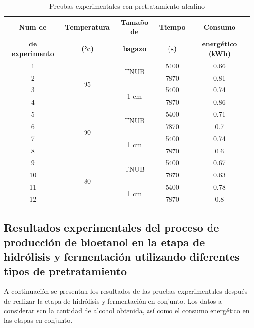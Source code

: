 \documentclass[12pt]{article}
\begin{document}
		
		\begin{table}[H]
			\centering
			\caption{Preubas experimentales con pretratamiento alcalino}
			\begin{tabular}{|c|c|c|c|c|}
				\hline
				\textbf{Num de} & \textbf{Temperatura} & \textbf{Tamaño de } & \textbf{Tiempo} & \textbf{Consumo } \\ 
			\textbf{de experimento}	&\textbf{ (°c)}&\textbf{ bagazo}  &\textbf{(s)}	&\textbf{ energético (kWh)}\\ \hline
				1 & \multirow{4}{*}{95} & \multirow{2}{*}{TNUB} & 5400 & 0.66  \\ \cline{1-1} \cline{4-5}
				2 &  &  & 7870 & 0.81  \\ \cline{3-5}  \cline{1-1} 
				3 &  & \multirow{2}{*}{1 cm} & 5400 & 0.74 \\  \cline{1-1} \cline{4-5}
				4 &  &  & 7870 & 0.86 \\ \cline{1-1}  \hline
				5 & \multirow{4}{*}{90}& \multirow{2}{*}{TNUB} & 5400 & 0.71  \\ \cline{1-1}  \cline{4-5}
				6 &  &  & 7870 & 0.7  \\ \cline{1-1} \cline{3-5}
				7 &  & \multirow{2}{*}{1 cm} & 5400 & 0.74 \\ \cline{1-1}\cline{4-5}
				8 &  &  & 7870 & 0.6 \\ \hline
				9 & \multirow{4}{*}{80} & \multirow{2}{*}{TNUB} & 5400 & 0.67  \\ \cline{1-1}\cline{4-5}
				10 &  &  & 7870 & 0.63  \\ \cline{1-1} \cline{3-5}
				11 &  &\multirow{2}{*}{1 cm} & 5400 & 0.78 \\ \cline{1-1}\cline{4-5}
				12 &  &  & 7870 & 0.8 \\ \hline
			\end{tabular}
			\label{Pretratamiento Alcalino}
		\end{table}
		
		
		
		
	
	\subsection{Resultados experimentales del proceso de producción de bioetanol en la etapa de hidrólisis y fermentación utilizando diferentes tipos de pretratamiento}
A continuación se presentan los resultados de las pruebas experimentales después de realizar la etapa de hidrólisis y fermentación en conjunto. Los datos a considerar son la cantidad de alcohol obtenida, así como el consumo energético en las etapas en conjunto.
\end{document}
